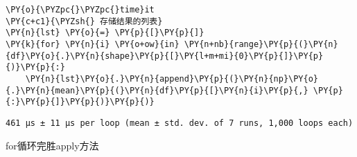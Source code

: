     \begin{tcolorbox}[breakable, size=fbox, boxrule=1pt, pad at break*=1mm,colback=cellbackground, colframe=cellborder]
\begin{Verbatim}[commandchars=\\\{\}]
\PY{o}{\PYZpc{}\PYZpc{}time}it
\PY{c+c1}{\PYZsh{} 存储结果的列表}
\PY{n}{lst} \PY{o}{=} \PY{p}{[}\PY{p}{]}
\PY{k}{for} \PY{n}{i} \PY{o+ow}{in} \PY{n+nb}{range}\PY{p}{(}\PY{n}{df}\PY{o}{.}\PY{n}{shape}\PY{p}{[}\PY{l+m+mi}{0}\PY{p}{]}\PY{p}{)}\PY{p}{:}
    \PY{n}{lst}\PY{o}{.}\PY{n}{append}\PY{p}{(}\PY{n}{np}\PY{o}{.}\PY{n}{mean}\PY{p}{(}\PY{n}{df}\PY{p}{[}\PY{n}{i}\PY{p}{,} \PY{p}{:}\PY{p}{]}\PY{p}{)}\PY{p}{)}
\end{Verbatim}
\end{tcolorbox}

    \begin{Verbatim}[commandchars=\\\{\}]
461 µs ± 11 µs per loop (mean ± std. dev. of 7 runs, 1,000 loops each)
    \end{Verbatim}

    for循环完胜apply方法
